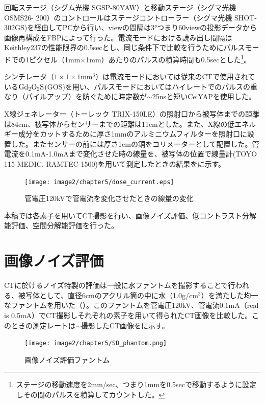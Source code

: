 回転ステージ（シグム光機 SGSP-80YAW）と移動ステージ（シグマ光機 OSMS26-
200）のコントロールはステージコントローラー（シグマ光機 SHOT-302GS)を経由してPCから行い、viewの間隔は3°つまり60viewの投影データから画像再構成をFBPによって行った。電流モードにおける読み出し間隔はKeithley237の性能限界の0.5secとし、同じ条件下で比較を行うためにパルスモードでの1ピクセル（1mm$\times$1mm）あたりのパルスの積算時間も0.5secとした\footnote{ステージの移動速度を2mm/sec、つまり1mmを0.5secで移動するように設定しその間のパルスを積算してカウントした。}。


シンチレータ（$1\times1\times1$mm$^3$）は電流モードにおいては従来のCTで使用されている$\rm Gd_2O_2S$(GOS)を用い、パルスモードにおいてはハイレートでのパルスの重なり（パイルアップ）を防ぐために時定数が$\sim$25nsと短いCe:YAPを使用した。

X線ジェネレーター（トーレック TRIX-150LE）の照射口から被写体までの距離は84cm、被写体からセンサーまでの距離は11cmとした。また、X線の低エネルギー成分をカットするために厚さ1mmのアルミニウムフィルターを照射口に設置した。またセンサーの前には厚さ1cmの銅をコリメーターとして配置した。管電流を0.1mA-1.0mAまで変化させた時の線量を、被写体の位置で線量計(TOYO 115 MEDIC, RAMTEC-1500)を用いて測定したときの結果をに示す。

\begin{figure}[H]
 \begin{center}
 \texttt{[image: image2/chapter5/dose\_current.eps]}
 \end{center}
 \caption{管電圧120kVで管電流を変化させたときの線量の変化}
 \label{fig:dose_current}
\end{figure}


本稿では各素子を用いてCT撮影を行い、画像ノイズ評価、低コントラスト分解能評価、空間分解能評価を行った。

\section{画像ノイズ評価\label{sec:noise}}
CTに於けるノイズ特製の評価は一般に水ファントムを撮影することで行われる、被写体として、直径6cmのアクリル筒の中に水（1.0g/cm$^3$）を満たした均一なファントムを用いた（）。このファントムを管電圧120kV、管電流0.1mA（real is 0.5mA）でCT撮影しそれぞれの素子を用いて得られたCT画像を比較した。このときの測定レートは$\sim$撮影したCT画像をに示す。

\begin{figure}[H]
 \begin{center}
 \texttt{[image: image2/chapter5/SD\_phantom.png]} 
 \end{center}
 \caption{画像ノイズ評価ファントム}
 \label{fig:SD_phantom}
\end{figure}


